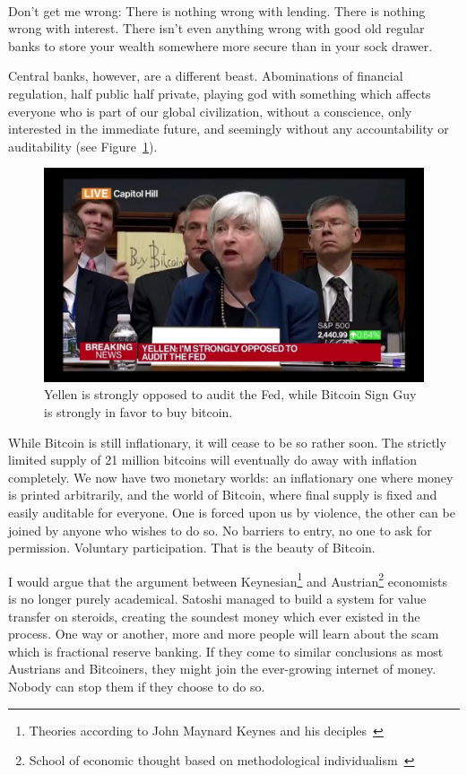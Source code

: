\paragraph{}
Don't get me wrong: There is nothing wrong with lending. There is
nothing wrong with interest. There isn't even anything wrong with good
old regular banks to store your wealth somewhere more secure than in
your sock drawer.

Central banks, however, are a different beast. Abominations of financial
regulation, half public half private, playing god with something which
affects everyone who is part of our global civilization, without a
conscience, only interested in the immediate future, and seemingly
without any accountability or auditability (see Figure~\ref{fig:bsg}).

\begin{figure}
  \centering
  \includegraphics{assets/images/bsg.jpg}
  \caption{Yellen is strongly opposed to audit the Fed, while Bitcoin Sign Guy is strongly in favor to buy bitcoin.}
  \label{fig:bsg}
\end{figure}

While Bitcoin is still inflationary, it will cease to be so rather soon.
The strictly limited supply of 21 million bitcoins will eventually do
away with inflation completely. We now have two monetary worlds: an
inflationary one where money is printed arbitrarily, and the world of
Bitcoin, where final supply is fixed and easily auditable for everyone.
One is forced upon us by violence, the other can be joined by anyone who
wishes to do so. No barriers to entry, no one to ask for permission.
Voluntary participation. That is the beauty of Bitcoin.

I would argue that the argument between Keynesian\footnote{Theories according to
John Maynard Keynes and his deciples~\cite{wiki:keynesian}} and
Austrian\footnote{School of economic thought based on methodological
individualism~\cite{wiki:austrian}} economists is no longer purely academical.
Satoshi managed to build a system for value transfer on steroids, creating the
soundest money which ever existed in the process. One way or another, more and
more people will learn about the scam which is fractional reserve banking. If
they come to similar conclusions as most Austrians and Bitcoiners, they might
join the ever-growing internet of money. Nobody can stop them if they choose to
do so.

